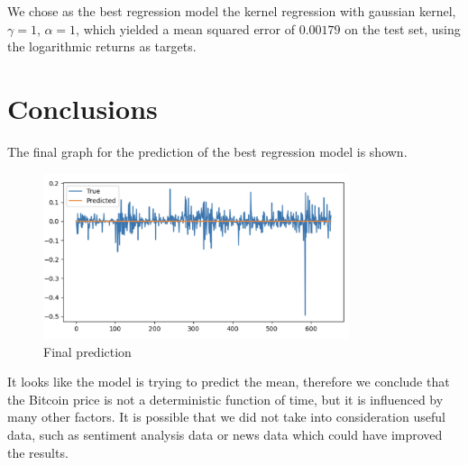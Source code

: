 \documentclass[12pt]{article}
\newcommand\blankpage{%
    \null
    \thispagestyle{empty}%
    \addtocounter{page}{-1}%
    \newpage}
\begin{document}
We chose as the best regression model the kernel regression with gaussian kernel, $\gamma=1$, $\alpha=1$, which yielded a mean squared error of $0.00179$ on the test set, using the logarithmic returns as targets.

\afterpage{\blankpage}

\section{Conclusions}
The final graph for the prediction of the best regression model is shown.

\begin{figure}[h]
    \includegraphics[width=0.8\textwidth]{final_plot}
    \caption{Final prediction}
    \label{fig:final}
\end{figure}

It looks like the model is trying to predict the mean, therefore we conclude that
the Bitcoin price is not a deterministic function of time, but it is influenced by many other factors.
It is possible that we did not take into consideration useful data, such as sentiment analysis data or news data which could have improved the results.
\end{document}
